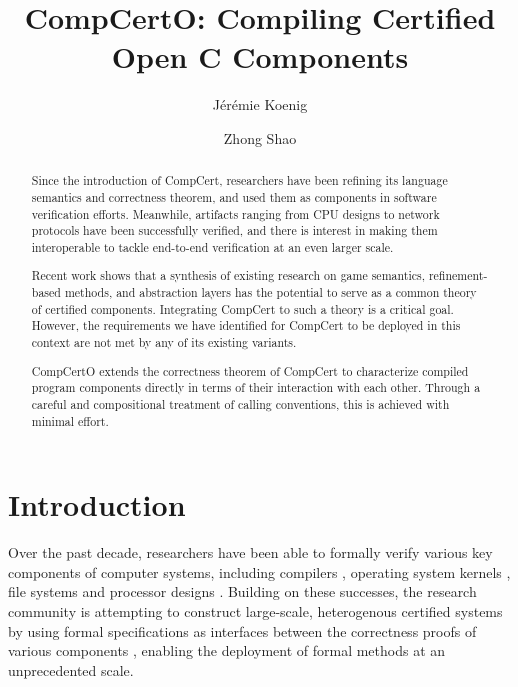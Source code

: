 \documentclass[sigplan,10pt,review]{acmart}
\title{CompCertO: Compiling Certified Open C Components} %
\author{J\'er\'emie Koenig}
\affiliation{
  \institution{Yale University}
  \city{New Haven}
  \state{CT}
  \country{USA}
}
\author{Zhong Shao}
\affiliation{
  \institution{Yale University}
  \city{New Haven}
  \state{CT}
  \country{USA}
}
\newcommand{\anon}[2]{#1}
\begin{document}
\begin{abstract} %
Since the introduction of CompCert,
researchers have been refining
its language semantics and correctness theorem,
and used them as components
in software verification efforts.
Meanwhile,
artifacts ranging from CPU designs to network protocols
have been successfully verified,
and there is interest in
making them interoperable
to tackle end-to-end verification
at an even larger scale.

Recent work shows that
a synthesis of existing research on
game semantics,
refinement-based methods, and
abstraction layers
has the potential to serve as a common theory
of certified components.
Integrating CompCert to such a theory
is a critical goal.
However,
the requirements we have identified for
CompCert to be deployed in this context
are not met by any of its existing variants.

CompCertO extends the correctness theorem of CompCert
to characterize compiled program components
directly in terms of their interaction with each other.
Through a careful and compositional treatment
of calling conventions,
this is achieved with minimal effort.
\end{abstract}

\maketitle

\section{Introduction} %


Over the past decade,
researchers have been able to formally verify
various key components of computer systems,
including
compilers \cite{compcert, vellvm},
operating system kernels \cite{sel4,popl15},
file systems \cite{fscq} and
processor designs \cite{safe,kami}.
Building on these successes,
the research community is attempting
to construct large-scale, heterogenous certified systems
by using formal specifications as interfaces between
the correctness proofs of various components %
\cite{deepspec},
enabling the deployment of formal methods
at an unprecedented scale.
\end{document}
